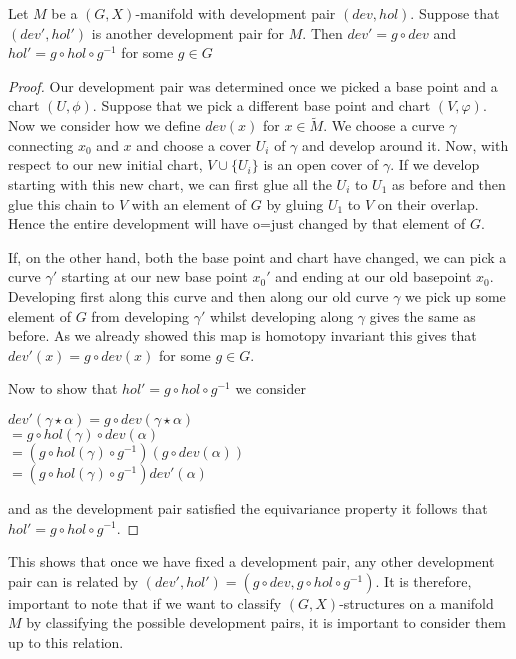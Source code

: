 \begin{lemma}
    Let $M$ be a $(G,X)$-manifold with development pair $(dev, hol)$. Suppose that $(dev', hol')$ is
    another development pair for $M$. Then $dev' = g\circ dev$ and $hol' = g\circ hol \circ g^{-1}$
    for some $g \in G$
\end{lemma}
\begin{proof}
    Our development pair was determined once we picked a base point and a chart $(U, \phi)$. Suppose that
    we pick a different base point and chart $(V, \varphi)$. Now we consider how we define $dev(x)$ for $x \in \tilde{M}$.
    We choose a curve $\gamma$ connecting $x_0$ and $x$ and choose a cover $U_i$ of $\gamma$ and develop around it.
    Now, with respect to our new initial chart, $V \cup \{U_i\}$ is an open cover of $\gamma$. If we develop starting with this new chart,
    we can first glue all the $U_i$ to $U_1$ as before and then glue this chain to $V$ with an element of $G$ by gluing
    $U_1$ to $V$ on their overlap. Hence the entire development will have o=just changed by that element of $G$.

    If, on the other hand, both the base point and chart have changed, we can pick
    a curve $\gamma'$ starting at our new base point $x_0'$ and ending at our old
    basepoint $x_0$. Developing first along this curve and then along our old curve
    $\gamma$ we pick up some element of $G$ from developing $\gamma'$ whilst
    developing along $\gamma$ gives the same as before. As we already showed this
    map is homotopy invariant this gives that $dev'(x) = g\circ dev(x)$ for some $g
        \in G$.

    Now to show that $hol' = g\circ hol \circ g^{-1}$ we consider
    \begin{center}
        $dev'(\gamma \star \alpha) = g \circ dev(\gamma \star \alpha)$\\
        $= g\circ hol(\gamma) \circ dev(\alpha)$\\
        $= (g\circ hol(\gamma)\circ g^{-1})(g\circ dev(\alpha))$\\
        $= (g \circ hol(\gamma)\circ g^{-1})dev'(\alpha)$
    \end{center}
    and as the development pair satisfied the equivariance property it follows that
    $hol' = g\circ hol \circ g^{-1}$.
\end{proof}

This shows that once we have fixed a development pair, any other development
pair can is related by $(dev', hol') = (g\circ dev, g\circ hol \circ g^{-1})$.
It is therefore, important to note that if we want to classify
$(G,X)$-structures on a manifold $M$ by classifying the possible development
pairs, it is important to consider them up to this relation.

